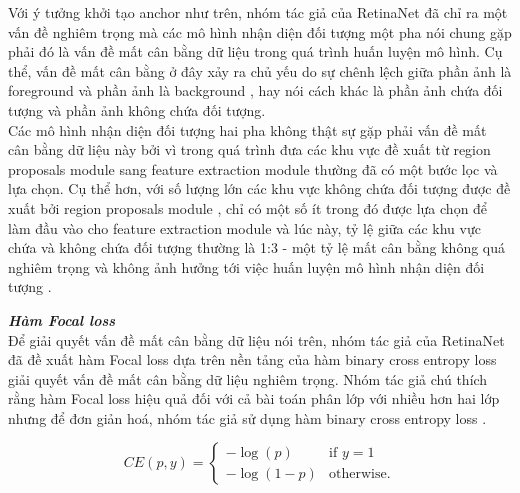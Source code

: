 {    \noindent
    Với ý tưởng khởi tạo anchor  như trên, nhóm tác giả của RetinaNet  đã chỉ ra một vấn đề nghiêm trọng mà các mô hình nhận diện đối tượng  một pha  nói chung gặp phải đó là vấn đề mất cân bằng dữ liệu  trong quá trình huấn luyện mô hình.
    Cụ thể, vấn đề mất cân bằng ở đây xảy ra chủ yếu do sự chênh lệch giữa phần ảnh là foreground  và phần ảnh là background , hay nói cách khác là phần ảnh chứa đối tượng và phần ảnh không chứa đối tượng. \\
    Các mô hình nhận diện đối tượng  hai pha  không thật sự gặp phải vấn đề mất cân bằng dữ liệu  này bởi vì trong quá trình đưa các khu vực đề xuất từ region proposals module  sang feature extraction module  thường đã có một bước lọc và lựa chọn.
    Cụ thể hơn, với số lượng lớn các khu vực không chứa đối tượng được đề xuất bởi region proposals module , chỉ có một số ít trong đó được lựa chọn để làm đầu vào cho feature extraction module  và lúc này, tỷ lệ giữa các khu vực chứa và không chứa đối tượng thường là 1:3 - một tỷ lệ mất cân bằng không quá nghiêm trọng và không ảnh hưởng tới việc huấn luyện mô hình nhận diện đối tượng .

    \noindent
    \textbf{\textit{Hàm Focal loss }} \\
    Để giải quyết vấn đề mất cân bằng dữ liệu  nói trên, nhóm tác giả của RetinaNet  đã đề xuất hàm Focal loss  dựa trên nền tảng của hàm binary cross entropy loss  giải quyết vấn đề mất cân bằng dữ liệu  nghiêm trọng.
    Nhóm tác giả chú thích rằng hàm Focal loss  hiệu quả đối với cả bài toán phân lớp với nhiều hơn hai lớp nhưng để đơn giản hoá, nhóm tác giả sử dụng hàm binary cross entropy loss .

    \begin{equation}
        \label{eq:bce}
        CE(p,y) = 
        \begin{cases}
            -\log(p) &\text{if $y = 1$} \\
            -\log (1 - p) &\text{otherwise.}
        \end{cases}
    \end{equation}

}
